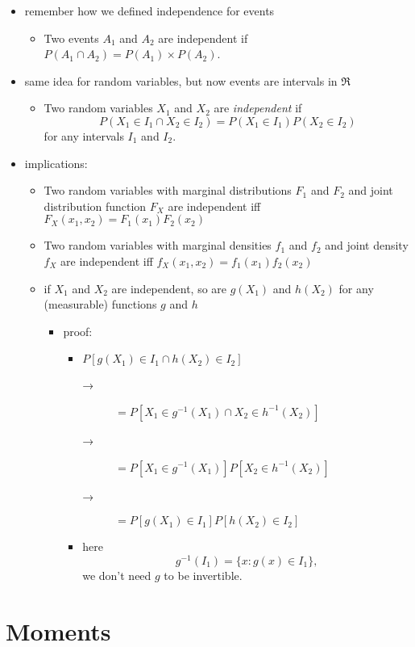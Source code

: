 \begin{itemize}
\item remember how we defined independence for events
\begin{itemize}
\item Two events $A_1$ and $A_2$ are independent if $P(A_1 \cap
         A_2) = P(A_1) \times P(A_2)$.
\end{itemize}
\item same idea for random variables, but now events are intervals in $\Re$
\begin{itemize}
\item Two random variables $X_1$ and $X_2$ are \emph{independent} if \[
         P(X_1 \in I_1 \cap X_2 \in I_2) = P(X_1 \in I_1) P(X_2 \in
         I_2)\] for any intervals $I_1$ and $I_2$.
\end{itemize}
\item implications:
\begin{itemize}
\item Two random variables with marginal distributions $F_1$ and
         $F_2$ and joint distribution function $F_X$ are independent iff
         $F_X(x_1, x_2) = F_1(x_1) F_2(x_2)$
\item Two random variables with marginal densities $f_1$ and $f_2$
         and joint density $f_X$ are independent iff 
         $f_X(x_1,x_2) = f_1(x_1) f_2(x_2)$
\item if $X_1$ and $X_2$ are independent, so are $g(X_1)$ and
         $h(X_2)$ for any (measurable) functions $g$ and $h$
\begin{itemize}
\item proof:
\begin{itemize}
\item $P[g(X_1) \in I_1 \cap h(X_2) \in I_2]$
\begin{description}
\item[→] $= P[X_1 \in g^{-1}(X_1) \cap X_2 \in h^{-1}(X_2)]$
\item[→] $= P[X_1 \in g^{-1}(X_1)] P[X_2 \in h^{-1}(X_2)]$
\item[→] $= P[g(X_1) \in I_1] P[h(X_2) \in I_2]$
\end{description}
\item here \[g^{-1}(I_1) = \{x : g(x) \in I_1\},\] we don't
             need $g$ to be invertible.
\end{itemize}
\end{itemize}
\end{itemize}
\end{itemize}
\section{Moments}
\label{sec-3}
